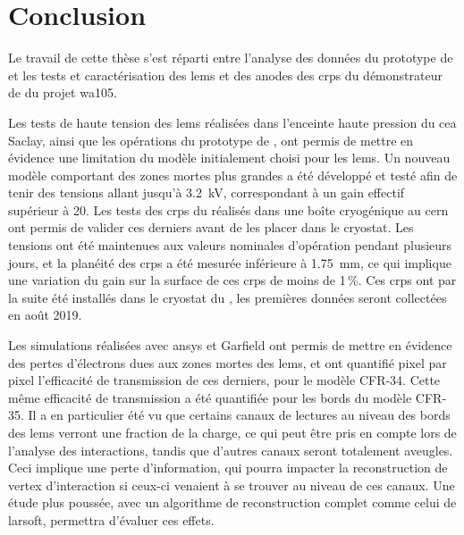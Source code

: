 \chapter{Conclusion}

Le travail de cette thèse s'est réparti entre l'analyse des données du prototype de \TOO{} et les tests et caractérisation des \glspl{lem} et des anodes des \glspl{crp} du démonstrateur de \SSS{} du projet \gls{wa105}.

Les tests de haute tension des \glspl{lem} réalisées dans l'enceinte haute pression du \gls{cea} Saclay, ainsi que les opérations du prototype de \TOO{}, ont permis de mettre en évidence une limitation du modèle initialement choisi pour les \glspl{lem}. Un nouveau modèle comportant des zones mortes plus grandes a été développé et testé afin de tenir des tensions allant jusqu'à \SI{3.2}{\kilo\volt}, correspondant à un gain effectif supérieur à 20. Les tests des \glspl{crp} du \SSS{} réalisés dans une boîte cryogénique au \gls{cern} ont permis de valider ces derniers avant de les placer dans le cryostat. Les tensions ont été maintenues aux valeurs nominales d'opération pendant plusieurs jours, et la planéité des \glspl{crp} a été mesurée inférieure à \SI{1.75}{\milli\meter}, ce qui implique une variation du gain sur la surface de ces \glspl{crp} de moins de 1\,\%. Ces \glspl{crp} ont par la suite été installés dans le cryostat du \SSS{}, les premières données seront collectées en août 2019.

Les simulations réalisées avec \gls{ansys} et Garfield ont permis de mettre en évidence des pertes d'électrons dues aux zones mortes des \glspl{lem}, et ont quantifié pixel par pixel l'efficacité de transmission de ces derniers, pour le modèle CFR-34. Cette même efficacité de transmission a été quantifiée pour les bords du modèle CFR-35. Il a en particulier été vu que certains canaux de lectures au niveau des bords des \glspl{lem} verront une fraction de la charge, ce qui peut être pris en compte lors de l'analyse des interactions, tandis que d'autres canaux seront totalement aveugles. Ceci implique une perte d'information, qui pourra impacter la reconstruction de vertex d'interaction si ceux-ci venaient à se trouver au niveau de ces canaux. Une étude plus poussée, avec un algorithme de reconstruction complet comme celui de \gls{larsoft}, permettra d'évaluer ces effets.

